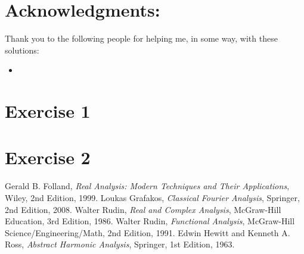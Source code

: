 \documentclass[twoside, titlepage]{amsart}
\makeatletter
\theoremstyle{plain} %
\theoremstyle{definition}
\theoremstyle{remark}
\theoremstyle{notation}
\renewenvironment{proof}[1][\proofname]{\par
	\pushQED{\qed}%
	\normalfont \topsep6\p@\@plus6\p@\relax
	\trivlist
	\item\relax
	{\itshape
		#1\@addpunct{.}}\hspace\labelsep\ignorespaces
}{%
\popQED\endtrivlist\@endpefalse
}
\makeatother
\begin{document}
	\section*{Acknowledgments:}
	Thank you to the following people for helping me, in some way, with these solutions:
	\begin{itemize}
		\item 
	\end{itemize}
	
	\clearpage
	
	\section*{Exercise 1}
	
		
	
	\begin{proof}
		
		
		
	\end{proof}
	
	\clearpage
	
	\section*{Exercise 2}
	
		
	
	\begin{proof}
		
		
		
	\end{proof}
	
	\clearpage
	
	\begin{thebibliography}{"Graf08"}
		Gerald B. Folland,
		\emph{Real Analysis: Modern Techniques and Their Applications},
		Wiley,
		2nd Edition,
		1999.
		Loukas Grafakos,
		\emph{Classical Fourier Analysis},
		Springer,
		2nd Edition,
		2008.
		Walter Rudin,
		\emph{Real and Complex Analysis},
		McGraw-Hill Education,
		3rd Edition,
		1986.
		Walter Rudin,
		\emph{Functional Analysis},
		McGraw-Hill Science/Engineering/Math,
		2nd Edition,
		1991.
		Edwin Hewitt and Kenneth A. Ross,
		\emph{Abstract Harmonic Analysis},
		Springer,
		1st Edition,
		1963.
	\end{thebibliography}
	
\end{document}
